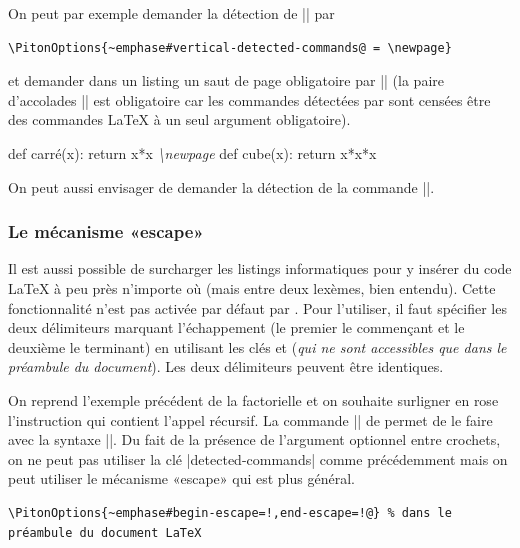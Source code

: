 \documentclass[dvipsnames,svgnames]{article}
\begin{document}
\smallskip
On peut par exemple demander la détection de |\newpage| par

\begin{Verbatim}
\PitonOptions{~emphase#vertical-detected-commands@ = \newpage}
\end{Verbatim}

et demander dans un listing un saut de page obligatoire par |\newpage{}| (la paire
d'accolades |{}| est obligatoire car les commandes détectées par  sont censées
être des commandes LaTeX à un seul argument obligatoire).

\medskip
\begin{Code}
\begin{Piton}
def carré(x):
    return x*x   \emph{\textbackslash{}newpage{}}
def cube(x):
    return x*x*x
\end{Piton}    
\end{Code}

\medskip
On peut aussi envisager de demander la détection de la commande |\vspace|.

\subsubsection{Le mécanisme «escape»}

\label{escape}

Il est aussi possible de surcharger les listings informatiques pour y insérer du code
LaTeX à peu près n'importe où (mais entre deux lexèmes, bien entendu). Cette
fonctionnalité n'est pas activée par défaut par . Pour l'utiliser, il faut
spécifier les deux délimiteurs marquant l'échappement (le premier le commençant et le
deuxième le terminant) en utilisant les clés  et
 (\emph{qui ne sont accessibles que dans le préambule du
  document}). Les deux délimiteurs peuvent être identiques.

\medskip
On reprend l'exemple précédent de la factorielle et on souhaite surligner en rose
l'instruction qui contient l'appel récursif. La commande |\highLight| de 
permet de le faire avec la syntaxe ||. Du fait de la présence de
l'argument optionnel entre crochets, on ne peut pas utiliser la clé |detected-commands|
comme précédemment mais on peut utiliser le mécanisme «escape» qui est plus général.

\smallskip
\begin{small}
\begin{Verbatim}
\PitonOptions{~emphase#begin-escape=!,end-escape=!@} % dans le préambule du document LaTeX
\end{Verbatim}
\end{small}
\end{document}
